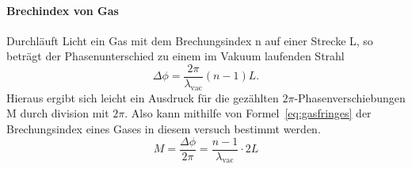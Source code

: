 \paragraph{Brechindex von Gas}
Durchläuft Licht ein Gas mit dem Brechungsindex n auf einer 
Strecke L, so beträgt der Phasenunterschied zu einem im Vakuum 
laufenden Strahl
\begin{equation}
\Delta\phi = \frac{2\pi}{\lambda_\text{vac}}(n-1)L.
\end{equation}
Hieraus ergibt sich leicht ein Ausdruck für die gezählten 
$2\pi$-Phasenverschiebungen M durch division mit $2\pi$.
Also kann mithilfe von Formel~\eqref{eq:gasfringes} der 
Brechungsindex eines Gases in diesem versuch bestimmt werden.
\begin{equation}
M = \frac{\Delta\phi}{2\pi} = \frac{n-1}{\lambda_\text{vac}}\cdot 2L
\label{eq:gasfringes}
\end{equation}
